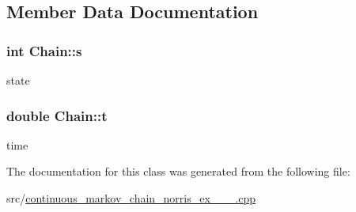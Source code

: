 \subsection{Member Data Documentation}
\hypertarget{classChain_a0edd1309c40f9d7d51d4b0ae5c831bb9}{}
\subsubsection[{s}]{\setlength{\rightskip}{0pt plus 5cm}int Chain\+::s}\label{classChain_a0edd1309c40f9d7d51d4b0ae5c831bb9}
state \hypertarget{classChain_a07bbad56f1ed3da3594326d8b14d1906}{}
\subsubsection[{t}]{\setlength{\rightskip}{0pt plus 5cm}double Chain\+::t}\label{classChain_a07bbad56f1ed3da3594326d8b14d1906}
time 

The documentation for this class was generated from the following file\+:\begin{DoxyCompactItemize}
\item 
src/\hyperlink{continuous__markov__chain__norris__ex__2__3__2_8cpp}{continuous\+\_\+markov\+\_\+chain\+\_\+norris\+\_\+ex\+\_\+\_\+\_.\+cpp}\end{DoxyCompactItemize}
